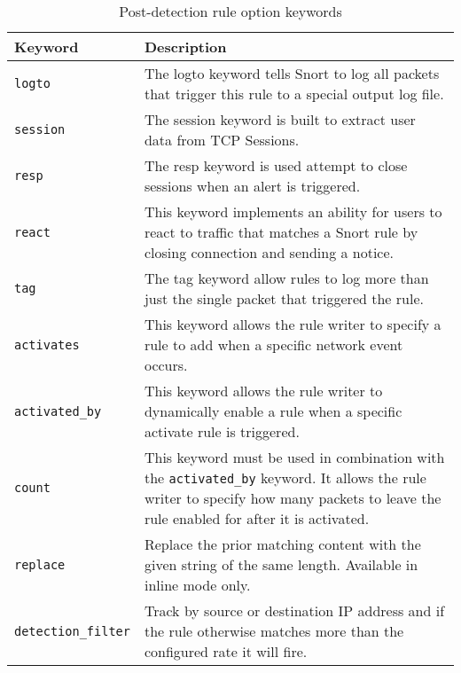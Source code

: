 \documentclass[english]{report}
\begin{document}
\begin{center}
\begin{longtable}[h]{| p{1in} | p{4.5in} |}
\caption{Post-detection rule option keywords} \\

\hline
Keyword & Description \\
\hline

\hline
\texttt{logto} &

The logto keyword tells Snort to log all packets that trigger this rule to a
special output log file. \\

\hline
\texttt{session} &

The session keyword is built to extract user data from TCP Sessions. \\

\hline
\texttt{resp} &

The resp keyword is used attempt to close sessions when an alert is triggered.
\\

\hline
\texttt{react} &

This keyword implements an ability for users to react to traffic that matches a
Snort rule by closing connection and sending a notice. \\

\hline
\texttt{tag} &

The tag keyword allow rules to log more than just the single packet that
triggered the rule. \\

\hline
\texttt{activates} &

This keyword  allows the rule writer to specify a rule to add when a specific
network event occurs. \\

\hline
\texttt{activated\_by} &

This keyword allows the rule writer to dynamically enable a rule when a
specific activate rule is triggered. \\

\hline
\texttt{count} &

This keyword must be used in combination with the \texttt{activated\_by}
keyword.  It allows the rule writer to specify how many packets to leave the
rule enabled for after it is activated. \\

\hline
\texttt{replace} & 

Replace the prior matching content with the given string of the same length.
Available in inline mode only.\\

\hline
\texttt{detection\_filter} & 

Track by source or destination IP address and if the rule otherwise matches
more than the configured rate it will fire.\\

\hline
\end{longtable}
\end{center}
\end{document}
